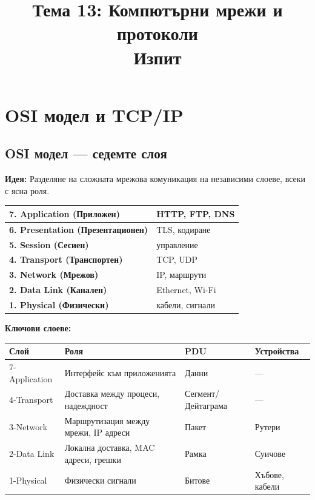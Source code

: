 \documentclass[12pt,a4paper]{article}
\begin{document}
\title{\textbf{Тема 13: Компютърни мрежи и протоколи}\\ \large{Изпит}}
\author{}
\date{}
\maketitle

\tableofcontents
\newpage

\section{OSI модел и TCP/IP}

\subsection{OSI модел — седемте слоя}

\textbf{Идея:} Разделяне на сложната мрежова комуникация на независими слоеве, всеки с ясна роля.

\begin{center}
\begin{tabular}{|l|l|}
\hline
\textbf{7. Application (Приложен)} & HTTP, FTP, DNS \\
\hline
\textbf{6. Presentation (Презентационен)} & TLS, кодиране \\
\hline
\textbf{5. Session (Сесиен)} & управление \\
\hline
\textbf{4. Transport (Транспортен)} & TCP, UDP \\
\hline
\textbf{3. Network (Мрежов)} & IP, маршрути \\
\hline
\textbf{2. Data Link (Канален)} & Ethernet, Wi-Fi \\
\hline
\textbf{1. Physical (Физически)} & кабели, сигнали \\
\hline
\end{tabular}
\end{center}

\vspace{0.5cm}

\textbf{Ключови слоеве:}

\begin{center}
\begin{tabular}{|l|p{5cm}|l|l|}
\hline
\textbf{Слой} & \textbf{Роля} & \textbf{PDU} & \textbf{Устройства} \\
\hline
7-Application & Интерфейс към приложенията & Данни & — \\
\hline
4-Transport & Доставка между процеси, надеждност & Сегмент/Дейтаграма & — \\
\hline
3-Network & Маршрутизация между мрежи, IP адреси & Пакет & Рутери \\
\hline
2-Data Link & Локална доставка, MAC адреси, грешки & Рамка & Суичове \\
\hline
1-Physical & Физически сигнали & Битове & Хъбове, кабели \\
\hline
\end{tabular}
\end{center}
\end{document}
